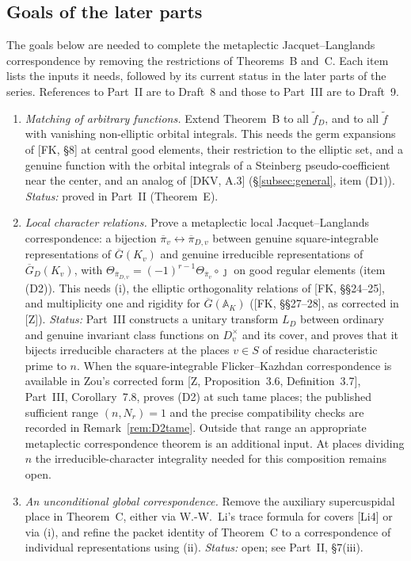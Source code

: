 \documentclass[12pt]{article}
\newcommand{\ov}[1]{\overline{#1}}
\newcommand{\A}{\mathbb{A}}
\newcommand{\Gb}{\ov{G}}
\newcommand{\GDb}{\ov{G}_D}
\newcommand{\pib}{\ov{\pi}}
\newcommand{\jj}{\jmath}
\theoremstyle{plain}
\theoremstyle{definition}
\begin{document}
\subsection{Goals of the later parts}\label{subsec:partII}
The goals below are needed to complete the metaplectic Jacquet--Langlands correspondence by removing the restrictions of Theorems~B and~C. Each item lists the inputs it needs, followed by its current status in the later parts of the series. References to Part~II are to Draft~8 and those to Part~III are to Draft~9.
\begin{enumerate}[label=(\roman*)]
\item \emph{Matching of arbitrary functions.} Extend Theorem~B to all $\tilde f_D$, and to all $\tilde f$ with vanishing non-elliptic orbital integrals. This needs the germ expansions of [FK, \S8] at central good elements, their restriction to the elliptic set, and a genuine function with the orbital integrals of a Steinberg pseudo-coefficient near the center, and an analog of [DKV, A.3] (\S\ref{subsec:general}, item (D1)). \emph{Status:} proved in Part~II (Theorem~E).
\item \emph{Local character relations.} Prove a metaplectic local Jacquet--Langlands correspondence: a bijection $\pib_v\leftrightarrow\pib_{D,v}$ between genuine square-integrable representations of $\Gb(K_v)$ and genuine irreducible representations of $\GDb(K_v)$, with $\Theta_{\pib_{D,v}}=(-1)^{r-1}\Theta_{\pib_v}\circ\jj$ on good regular elements (item (D2)). This needs (i), the elliptic orthogonality relations of [FK, \S\S24--25], and multiplicity one and rigidity for $\Gb(\A_K)$ ([FK, \S\S27--28], as corrected in [Z]). \emph{Status:} Part~III constructs a unitary transform $L_D$ between ordinary and genuine invariant class functions on $D_v^\times$ and its cover, and proves that it bijects irreducible characters at the places $v\in S$ of residue characteristic prime to $n$. When the square-integrable Flicker--Kazhdan correspondence is available in Zou's corrected form [Z, Proposition~3.6, Definition~3.7], Part~III, Corollary~7.8, proves (D2) at such tame places; the published sufficient range $(n,N_r)=1$ and the precise compatibility checks are recorded in Remark~\ref{rem:D2tame}. Outside that range an appropriate metaplectic correspondence theorem is an additional input. At places dividing $n$ the irreducible-character integrality needed for this composition remains open.
\item \emph{An unconditional global correspondence.} Remove the auxiliary supercuspidal place in Theorem~C, either via W.-W.~Li's trace formula for covers [Li4] or via (i), and refine the packet identity of Theorem~C to a correspondence of individual representations using (ii). \emph{Status:} open; see Part~II, \S7(iii).

\end{enumerate}
\end{document}
